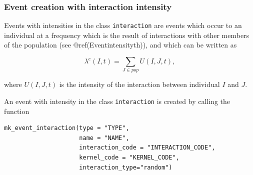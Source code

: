 \begin{Shaded}
\begin{Highlighting}[]
\OtherTok{\textless{}{-}} \NormalTok{(}\NormalTok{(}\NormalTok{),}
                                  \NormalTok{(}\NormalTok{(}\NormalTok{,}\NormalTok{),}
                                       \NormalTok{(}\NormalTok{,}\NormalTok{)))}
\NormalTok{(}\NormalTok{, }\NormalTok{) }
\OtherTok{\textless{}{-}} \NormalTok{(}\OtherTok{=}

\OtherTok{\textless{}{-}} \NormalTok{(} \NormalTok{,}
                     \NormalTok{)}
\end{Highlighting}
\end{Shaded}

\hypertarget{event-creation-with-interaction-intensity}{%
\subsubsection{Event creation with interaction intensity}\label{event-creation-with-interaction-intensity}}

Events with intensities in the class \texttt{interaction} are events which occur to an individual at a frequency which is the result of interactions with other members of the population (see @ref(Eventintensityth)), and which can be written as

\begin{equation*}
\lambda^e(I,t) = \sum_{J \in pop} U(I,J,t),
\end{equation*}

where \(U(I,J,t)\) is the intensity of the interaction between individual \(I\) and \(J\).

An event with intensity in the class \texttt{interaction} is created by calling the function

\begin{verbatim}
mk_event_interaction(type = "TYPE",
                     name = "NAME",
                     interaction_code = "INTERACTION_CODE",
                     kernel_code = "KERNEL_CODE",
                     interaction_type="random")
\end{verbatim}

